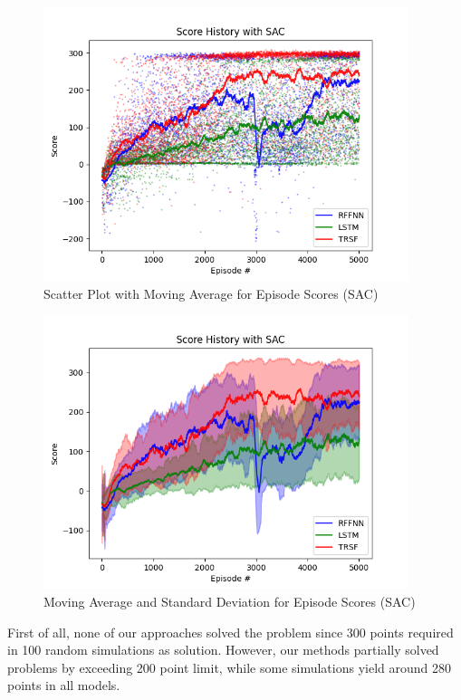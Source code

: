 \begin{figure}
	\centering
	\includegraphics[width=0.95\textwidth]{figures/bipedal/SCATTER_SAC_RFFNN_LSTM_TRSF.png}
	\caption{Scatter Plot with Moving Average for Episode Scores (SAC)}
	\label{fig:sac_scatter_ep_rewards}
\end{figure}
\begin{figure}
	\centering
	\includegraphics[width=0.95\textwidth]{figures/bipedal/STD_SAC_RFFNN_LSTM_TRSF.png}
	\caption{Moving Average and Standard Deviation for Episode Scores (SAC)}
	\label{fig:sac_std_ep_rewards}
\end{figure} 

First of all, none of our approaches solved the problem since 300 points required in 100 random simulations as solution. 
However, our methods partially solved problems by exceeding 200 point limit, while some simulations yield around 280 points in all models. 

